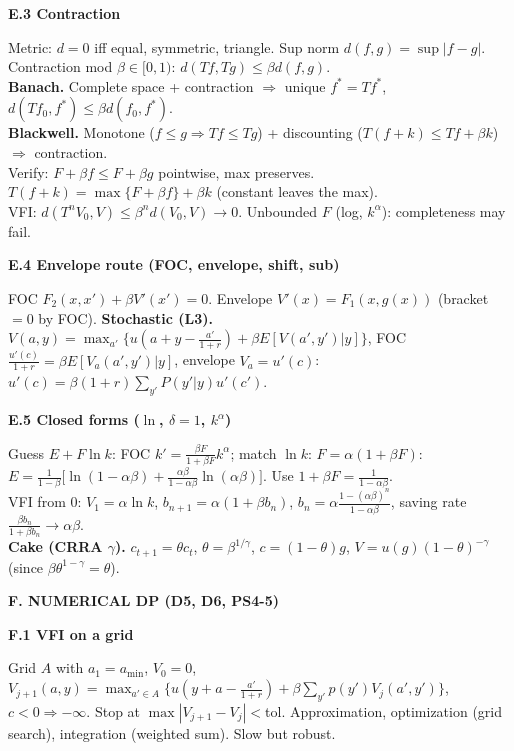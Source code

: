\documentclass[12pt]{article}
\newcommand{\qhd}[1]{\par\vspace{4pt}%
  \colorbox{black!80}{\parbox{\dimexpr\linewidth-2\fboxsep}{\color{white}\bfseries #1}}\par\nopagebreak\vspace{2pt}}
\newcommand{\hd}[1]{\par\vspace{3pt}%
  \colorbox{black!12}{\parbox{\dimexpr\linewidth-2\fboxsep}{\bfseries #1}}\par\nopagebreak\vspace{1pt}}
\newcommand{\sub}[1]{\textbf{#1} }
\newcommand{\key}[1]{\fbox{$\displaystyle #1$}}
\begin{document}
\hd{E.3 Contraction}
Metric: $d=0$ iff equal, symmetric, triangle. Sup norm $d(f,g)=\sup|f-g|$.
Contraction mod $\beta\in[0,1)$: $d(Tf,Tg)\le\beta d(f,g)$.\\
\sub{Banach.} Complete space + contraction $\Rightarrow$ unique $f^*=Tf^*$,
$d(Tf_0,f^*)\le\beta d(f_0,f^*)$.\\
\sub{Blackwell.} Monotone ($f\le g\Rightarrow Tf\le Tg$) + discounting
($T(f+k)\le Tf+\beta k$) $\Rightarrow$ contraction.\\
Verify: $F+\beta f\le F+\beta g$ pointwise, max preserves. $T(f+k)=\max\{F+\beta f\}+\beta k$
(constant leaves the max).\\
VFI: $d(T^nV_0,V)\le\beta^nd(V_0,V)\to0$. Unbounded $F$ (log, $k^\alpha$): completeness may fail.

\hd{E.4 Envelope route (FOC, envelope, shift, sub)}
FOC $F_2(x,x')+\beta V'(x')=0$. Envelope $V'(x)=F_1(x,g(x))$ (bracket $=0$ by FOC).
\key{F_2(x,g(x))+\beta F_1(g(x),g(g(x)))=0}
\sub{Stochastic (L3).} $V(a,y)=\max_{a'}\{u(a+y-\frac{a'}{1+r})+\beta E[V(a',y')|y]\}$,
FOC $\frac{u'(c)}{1+r}=\beta E[V_a(a',y')|y]$, envelope $V_a=u'(c)$:
$u'(c)=\beta(1+r)\sum_{y'}P(y'|y)u'(c')$.

\hd{E.5 Closed forms ($\ln$, $\delta=1$, $k^\alpha$)}
Guess $E+F\ln k$: FOC $k'=\frac{\beta F}{1+\beta F}k^\alpha$; match $\ln k$:
$F=\alpha(1+\beta F)$:
\key{F=\frac{\alpha}{1-\alpha\beta},\ k'=\alpha\beta k^\alpha,\ c=(1-\alpha\beta)k^\alpha}
$E=\frac{1}{1-\beta}\big[\ln(1-\alpha\beta)+\frac{\alpha\beta}{1-\alpha\beta}\ln(\alpha\beta)\big]$.
Use $1+\beta F=\frac{1}{1-\alpha\beta}$.\\
VFI from 0: $V_1=\alpha\ln k$, $b_{n+1}=\alpha(1+\beta b_n)$,
$b_n=\alpha\frac{1-(\alpha\beta)^n}{1-\alpha\beta}$, saving rate $\frac{\beta b_n}{1+\beta b_n}\to\alpha\beta$.\\
\sub{Cake (CRRA $\gamma$).} $c_{t+1}=\theta c_t$, $\theta=\beta^{1/\gamma}$,
$c=(1-\theta)g$, $V=u(g)(1-\theta)^{-\gamma}$ (since $\beta\theta^{1-\gamma}=\theta$).

\qhd{F. NUMERICAL DP (D5, D6, PS4-5)}

\hd{F.1 VFI on a grid}
Grid $A$ with $a_1=a_{\min}$, $V_0=0$,
$V_{j+1}(a,y)=\max_{a'\in A}\{u(y+a-\frac{a'}{1+r})+\beta\sum_{y'}p(y')V_j(a',y')\}$,
$c<0\Rightarrow-\infty$. Stop at $\max|V_{j+1}-V_j|<$tol. Approximation,
optimization (grid search), integration (weighted sum). Slow but robust.
\end{document}
